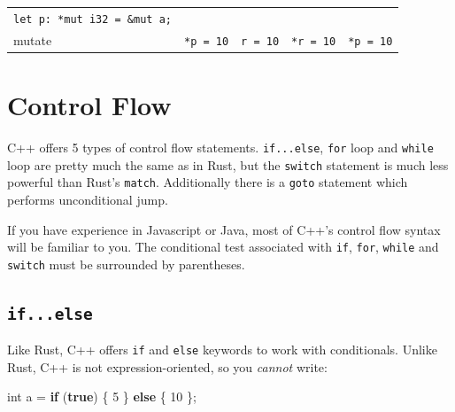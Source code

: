 \documentclass[
]{book}
\newenvironment{Shaded}{\begin{snugshade}}{\end{snugshade}}
\newcommand{\ControlFlowTok}[1]{\textcolor[rgb]{0.13,0.29,0.53}{\textbf{#1}}}
\newcommand{\DataTypeTok}[1]{\textcolor[rgb]{0.13,0.29,0.53}{#1}}
\newcommand{\DecValTok}[1]{\textcolor[rgb]{0.00,0.00,0.81}{#1}}
\newcommand{\KeywordTok}[1]{\textcolor[rgb]{0.13,0.29,0.53}{\textbf{#1}}}
\newcommand{\NormalTok}[1]{#1}
\begin{document}
\begin{longtable}[]{@{}lllll@{}}
\begin{minipage}[t]{0.25\columnwidth}
\texttt{let\ p:\ *mut\ i32\ =\ \&mut\ a;}\strut
\end{minipage}\tabularnewline
\begin{minipage}[t]{0.12\columnwidth}\raggedright
mutate\strut
\end{minipage} & \begin{minipage}[t]{0.12\columnwidth}\raggedright
\texttt{*p\ =\ 10}\strut
\end{minipage} & \begin{minipage}[t]{0.14\columnwidth}\raggedright
\texttt{r\ =\ 10}\strut
\end{minipage} & \begin{minipage}[t]{0.24\columnwidth}\raggedright
\texttt{*r\ =\ 10}\strut
\end{minipage} & \begin{minipage}[t]{0.25\columnwidth}\raggedright
\texttt{*p\ =\ 10}\strut
\end{minipage}\tabularnewline
\bottomrule
\end{longtable}

\hypertarget{control-flow}{%
\section{Control Flow}\label{control-flow}}

C++ offers 5 types of control flow statements. \texttt{if...else}, \texttt{for} loop and \texttt{while} loop are pretty much the same as in Rust, but the \texttt{switch} statement is much less powerful than Rust's \texttt{match}. Additionally there is a \texttt{goto} statement which performs unconditional jump.

If you have experience in Javascript or Java, most of C++'s control flow syntax will be familiar to you. The conditional test associated with \texttt{if}, \texttt{for}, \texttt{while} and \texttt{switch} must be surrounded by parentheses.

\hypertarget{if...else}{%
\subsection{\texorpdfstring{\texttt{if...else}}{if...else}}\label{if...else}}

Like Rust, C++ offers \texttt{if} and \texttt{else} keywords to work with conditionals. Unlike Rust, C++ is not expression-oriented, so you \emph{cannot} write:

\begin{Shaded}
\begin{Highlighting}[]
\DataTypeTok{int}\NormalTok{ a = }\ControlFlowTok{if}\NormalTok{ (}\KeywordTok{true}\NormalTok{) \{ }\DecValTok{5}\NormalTok{ \} }\ControlFlowTok{else}\NormalTok{ \{ }\DecValTok{10}\NormalTok{ \};}
\end{Highlighting}
\end{Shaded}
\end{document}
